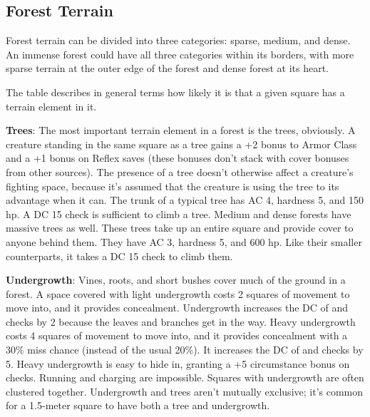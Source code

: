 \subsection{Forest Terrain}
Forest terrain can be divided into three categories: sparse, medium, and dense. An immense forest could have all three categories within its borders, with more sparse terrain at the outer edge of the forest and dense forest at its heart.

The table describes in general terms how likely it is that a given square has a terrain element in it.


\textbf{Trees}: The most important terrain element in a forest is the trees, obviously. A creature standing in the same square as a tree gains a +2 bonus to Armor Class and a +1 bonus on Reflex saves (these bonuses don't stack with cover bonuses from other sources). The presence of a tree doesn't otherwise affect a creature's fighting space, because it's assumed that the creature is using the tree to its advantage when it can. The trunk of a typical tree has AC 4, hardness 5, and 150 hp. A DC 15  check is sufficient to climb a tree. Medium and dense forests have massive trees as well. These trees take up an entire square and provide cover to anyone behind them. They have AC 3, hardness 5, and 600 hp. Like their smaller counterparts, it takes a DC 15  check to climb them.

\textbf{Undergrowth}: Vines, roots, and short bushes cover much of the ground in a forest. A space covered with light undergrowth costs 2 squares of movement to move into, and it provides concealment. Undergrowth increases the DC of  and  checks by 2 because the leaves and branches get in the way. Heavy undergrowth costs 4 squares of movement to move into, and it provides concealment with a 30\% miss chance (instead of the usual 20\%). It increases the DC of  and  checks by 5. Heavy undergrowth is easy to hide in, granting a +5 circumstance bonus on  checks. Running and charging are impossible. Squares with undergrowth are often clustered together. Undergrowth and trees aren't mutually exclusive; it's common for a 1.5-meter square to have both a tree and undergrowth.

